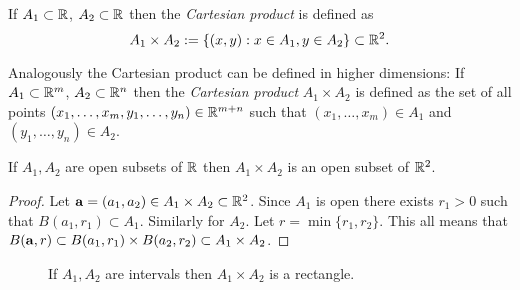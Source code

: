 \begin{definition}
    If \(A_1 \subset \bR\), \(A_2 \subset \bR\) then the \emph{Cartesian product} is defined as
    \[
        A_1 \times A_2 := \left\{(x,y): x \in A_1, y \in A_2\right\}
        \subset \bR^{2}.
    \]
\end{definition}

Analogously the Cartesian product can be defined in higher dimensions:
If \(A_1 \subset \bR^m\), \(A_2 \subset \bR^n\) then the \emph{Cartesian product} \(A_1 \times A_2\) is defined as the set of all points \((x_1,\ldots,x_m,y_1,\ldots,y_n) \in \bR^{m+n}\) such that \((x_1,\ldots,x_m) \in A_1\) and \((y_1,\ldots,y_n) \in A_2\).


\begin{lemma*}
    If \(A_1, A_2\) are open subsets of \(\bR\) then \( A_1 \times A_2 \) is an open subset of \(\bR^2\).
\end{lemma*}
\begin{proof}
    Let \(\aa = (a_1,a_2) \in A_1\times A_2 \subset \bR^2\).
    Since  \(A_1\) is open there  exists \(r_1>0\) such that \(B(a_1,r_1)\subset A_1\).
    Similarly for \(A_2\).
    Let \(r=\min \{r_1,r_2\}\).
    This all means that \(B(\aa,r) \subset B(a_1,r_1) \times B(a_2,r_2) \subset A_1\times A_2\).
\end{proof}


\begin{figure}[htb]
    \begin{centering}
        \caption{If \(A_1, A_2\) are intervals then \( A_1 \times A_2 \) is a rectangle.}
    \end{centering}
\end{figure}

